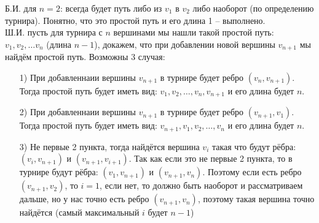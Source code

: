 \documentclass[a4paper,12pt]{article} %
\begin{document}
Б.И. для $ n = 2 $: всегда будет путь либо из $ v_1 $ в $ v_2 $ либо наоборот (по определению турнира). Понятно, что это простой путь и его длина 1 -- выполнено.\\

Ш.И. пусть для турнира с $ n $ вершинами мы нашли такой простой путь: $ v_1, v_2, \ldots v_n $ (длина $ n - 1 $), докажем, что при добавлении новой вершины $ v_{n+1} $ мы найдём простой путь. Возможны 3 случая:
\begin{itemize}
\item[1) ] При добавленнаии вершины $ v_{n+1} $ в турнире будет ребро $ (v_n, v_{n+1}) $. Тогда простой путь будет иметь вид: $ v_1, v_2, \ldots, v_n, v_{n+1} $ и его длина будет $ n $.
\item[2) ] При добавленнаии вершины $ v_{n+1} $ в турнире будет ребро $ (v_{n+1}, v_{1}) $. Тогда простой путь будет иметь вид: $ v_{n+1}, v_1, v_2, \ldots, v_n $ и его длина будет $ n $.
\item[3) ] Не первые 2 пункта, тогда найдётся вершина $ v_i $ такая что будут рёбра: $ (v_i, v_{n+1}) $ и $ (v_{n+1}, v_{i+1}) $. Так как если это не первые 2 пункта, то в турнире будут рёбра: $(v_1, v_{n+1})$ и $ (v_{n+1}, v_n) $. Поэтому если есть ребро $ (v_{n+1}, v_2) $, то $ i = 1 $, если нет, то должно быть наоборот и рассматриваем дальше, но у нас точно есть ребро  $ (v_{n+1}, v_n) $, поэтому такая вершина точно найдётся (самый максимальный $ i $ будет $ n-1 $)


\end{itemize}
\end{document}
